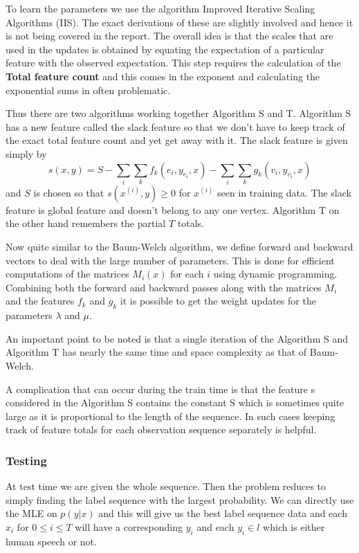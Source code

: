 \documentclass[letterpaper]{article} %
\begin{document}
To learn the parameters we use the algorithm Improved Iterative Scaling Algorithms (IIS). The exact derivations of these are slightly involved and hence it is not being covered in the report. The overall idea is that the scales that are used in the updates is obtained by equating the expectation of a particular feature with the observed expectation. This step requires the calculation of the \textbf{Total feature count} and this comes in the exponent and calculating the exponential sums in often problematic.

Thus there are two algorithms working together Algorithm S and T. Algorithm S has a new feature called the slack feature so that we don't have to keep track of the exact total feature count and yet get away with it. The slack feature is given simply by $$s(x, y) = S - \sum_i \sum_k f_k(e_i, y_{e_i}, x) - \sum_i \sum_k g_k(v_i, y_{v_i}, x)$$ and $S$ is chosen so that $s(x^{(i)}, y) \ge 0$ for $x^{(i)}$ seen in training data. The slack feature is global feature and doesn't belong to any one vertex. Algorithm T on the other hand remembers the partial $T$ totals.

Now quite similar to the Baum-Welch algorithm, we define forward and backward vectors to deal with the large number of parameters. This is done for efficient computations of the matrices $M_i(x)$ for each $i$ using dynamic programming. Combining both the forward and backward passes along with the matrices $M_i$ and the features $f_k$ and $g_k$ it is possible to get the weight updates for the parameters $\lambda$ and $\mu$.

An important point to be noted is that a single iteration of the Algorithm S and Algorithm T has nearly the same time and space complexity as that of Baum-Welch.

A complication that can occur during the train time is that the feature s considered in the Algorithm S contains the constant S which is sometimes quite large as it is proportional to the length of the sequence. In such cases keeping track of feature totals for each observation sequence separately is helpful.

\subsubsection{Testing} At test time we are given the whole sequence. Then the problem reduces to simply finding the label sequence with the largest probability. We can directly use the MLE on $p(y|x)$ and this will give us the best label sequence data and each $x_i$ for $0 \le i \le T$ will have a corresponding $y_i$ and each $y_i \in l$ which is either human speech or not.
\end{document}
